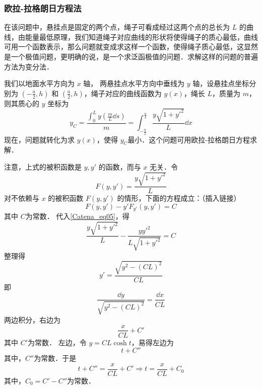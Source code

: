 \subsubsection{欧拉-拉格朗日方程法}
在该问题中，悬挂点是固定的两个点，绳子可看成经过这两个点的总长为 $L$ 的曲线，由能量最低原理，我们知道绳子对应曲线的形状将使得绳子的质心最低，曲线可用一个函数表示，那么问题就变成求这样一个函数，使得绳子质心最低，这显然是一个极值问题，更明确的说，是一个求泛函极值的问题．求解这样的问题的普遍方法为变分法．

我们以地面水平方向为 $x$ 轴， 两悬挂点水平方向中垂线为 $y$ 轴，设悬挂点坐标分别为 $(-\frac{a}{2},h)$ 和 $(\frac{a}{2},h)$，绳子对应的曲线函数为 $y(x)$，绳长 $L$，质量为 $m$，则其质心的 $y$ 坐标为
\begin{equation}
y_C=\frac{\int_{0}^{L}y(\frac{m}{L}\dd s)}{m}=\int_{-\frac{a}{2}}^{\frac{a}{2}} \frac{y\sqrt{1+y'^2}}{L}\dd x
\end{equation}
现在，问题就转化为求 $y(x)$，使得 $y_C$最小．这个问题可用欧拉-拉格朗日方程求解．

注意，上式的被积函数是 $y,y'$ 的函数，而与 $x$ 无关．令 
\begin{equation}\label{Catena_eq05}
F(y,y')=\frac{y\sqrt{1+y'^2}}{L}
\end{equation}
对不依赖与 $x$ 的被积函数 $F(y,y')$ 的情形，下面的方程成立：（插入链接）
\begin{equation}
F(y,y')-y'F_{y'}(y,y')=C
\end{equation}
其中 $C$为常数．
代入\autoref{Catena_eq05}，得
\begin{equation}
\frac{y\sqrt{1+y'^2}}{L}-\frac{yy'^2}{L\sqrt{1+y'^2}}=C
\end{equation}
整理得
\begin{equation}
y'=\frac{\sqrt{y^2-(CL)^2}}{CL}
\end{equation}
即
\begin{equation}
\frac{\dd y}{\sqrt{y^2-(CL)^2}}=\frac{\dd x}{CL}
\end{equation}
两边积分，右边为
\begin{equation}
\frac{x}{CL}+C'
\end{equation}
其中 $C'$为常数．
左边，令 $y=CL\cosh t $，易得左边为
\begin{equation}
t+C''
\end{equation}
其中，$C''$为常数．于是
\begin{equation}
t+C''=\frac{x}{CL}+C'\Rightarrow t=\frac{x}{CL}+C_0
\end{equation}
其中，$C_0=C'-C''$为常数．

